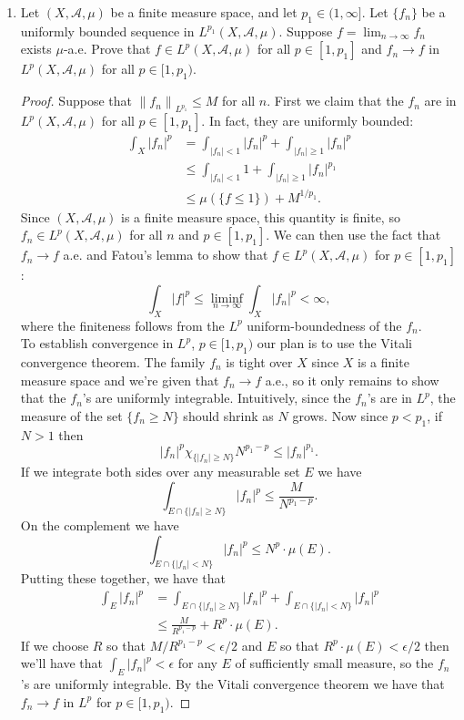 \documentclass[11pt,letterpaper]{report}
\newcommand{\mcal}[1]{\mathcal{#1}}
\newcommand{\Lp}[2]{\left\|{#1}\right\|_{L^{#2}}}
\begin{document}
\begin{enumerate}
	\item Let $(X, \mcal{A}, \mu)$ be a finite measure space, and let $p_1\in (1, \infty]$. Let $\{f_n\}$ be a uniformly bounded sequence in $L^{p_1}(X, \mcal{A}, \mu)$. Suppose $f = \lim_{n\to \infty}f_n$ exists $\mu$-a.e. Prove that $f\in L^p(X, \mcal{A}, \mu)$ for all $p\in [1, p_1]$ and $f_n\to f$ in $L^p(X, \mcal{A}, \mu)$ for all $p\in [1, p_1)$.
	\begin{proof}
		Suppose that $\Lp{f_n}{p_1}\leq M$ for all $n$. First we claim that the $f_n$ are in $L^p(X, \mcal{A}, \mu)$ for all $p\in [1, p_1]$. In fact, they are uniformly bounded:
		\begin{align*}
			\int_X|f_n|^p &= \int_{|f_n|<1}|f_n|^p + \int_{|f_n|\geq 1}|f_n|^p\\
			&\leq \int_{|f_n|<1}1 + \int_{|f_n|\geq 1}|f_n|^{p_1}\\
			&\leq \mu(\{f\leq 1\}) + M^{1/p_1}.
		\end{align*}
		Since $(X, \mcal{A}, \mu)$ is a finite measure space, this quantity is finite, so $f_n\in L^p(X, \mcal{A}, \mu)$ for all $n$ and $p\in [1, p_1]$. We can then use the fact that $f_n\to f$ a.e. and Fatou's lemma to show that $f\in L^p(X, \mcal{A}, \mu)$ for $p\in [1, p_1]$:
		\[
		\int_X|f|^p \leq \liminf_{n\to \infty}\int_X|f_n|^p<\infty,
		\]
		where the finiteness follows from the $L^p$ uniform-boundedness of the $f_n$.\\

		\noindent To establish convergence in $L^p$, $p\in [1, p_1)$ our plan is to use the Vitali convergence theorem. The family $f_n$ is tight over $X$ since $X$ is a finite measure space and we're given that $f_n\to f$ a.e., so it only remains to show that the $f_n$'s are uniformly integrable. Intuitively, since the $f_n$'s are in $L^p$, the measure of the set $\{f_n \geq N\}$ should shrink as $N$ grows.  Now since $p<p_1$, if $N>1$ then
		\[
		|f_n|^p\chi_{\{|f_n|\geq N\}}N^{p_1-p}\leq |f_n|^{p_1}.
		\]
		If we integrate both sides over any measurable set $E$ we have
		\[
		\int_{E\cap \{|f_n|\geq N\}}|f_n|^p \leq \frac{M}{N^{p_1-p}}.
		\]
		On the complement we have
		\[
		\int_{E\cap \{|f_n|<N\}}|f_n|^p \leq N^p\cdot \mu(E).
		\]
		Putting these together, we have that
		\begin{align*}
			\int_E|f_n|^p &= \int_{E\cap \{|f_n|\geq N\}}|f_n|^p + \int_{E\cap \{|f_n|<N\}}|f_n|^p\\
			&\leq \frac{M}{R^{p_1-p}} + R^p\cdot\mu(E).
		\end{align*}
		If we choose $R$ so that $M/R^{p_1-p}<\epsilon/2$ and $E$ so that $R^p\cdot \mu(E)<\epsilon/2$ then we'll have that $\int_E |f_n|^p<\epsilon$ for any $E$ of sufficiently small measure, so the $f_n$'s are uniformly integrable. By the Vitali convergence theorem we have that $f_n\to f$ in $L^p$ for $p\in [1, p_1)$.
	\end{proof}


\end{enumerate}
\end{document}
